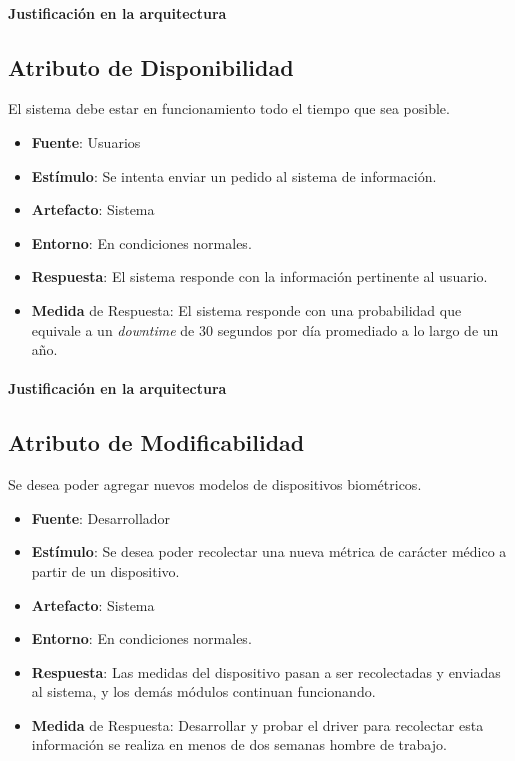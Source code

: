 \paragraph{Justificación en la arquitectura}


\subsection{Atributo de Disponibilidad}
El sistema debe estar en funcionamiento todo el tiempo que sea posible.

\begin{itemize}
  \item \textbf{Fuente}: Usuarios
  \item \textbf{Estímulo}: Se intenta enviar un pedido al sistema de información.
  \item \textbf{Artefacto}: Sistema
  \item \textbf{Entorno}: En condiciones normales.
  \item \textbf{Respuesta}: El sistema responde con la información pertinente al usuario.
  \item \textbf{Medida} de Respuesta: El sistema responde con una probabilidad que equivale a un \emph{downtime} de 30 segundos por día promediado a lo largo de un año.
\end{itemize}

\paragraph{Justificación en la arquitectura}


\subsection{Atributo de Modificabilidad}
Se desea poder agregar nuevos modelos de dispositivos biométricos.

\begin{itemize}
  \item \textbf{Fuente}: Desarrollador
  \item \textbf{Estímulo}: Se desea poder recolectar una nueva métrica de carácter médico a partir de un dispositivo.
  \item \textbf{Artefacto}: Sistema
  \item \textbf{Entorno}: En condiciones normales.
  \item \textbf{Respuesta}: Las medidas del dispositivo pasan a ser recolectadas y enviadas al sistema, y los demás módulos continuan funcionando.
  \item \textbf{Medida} de Respuesta: Desarrollar y probar el driver para recolectar esta información se realiza en menos de dos semanas hombre de trabajo.
\end{itemize}

